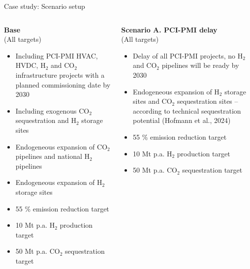 \documentclass[10pt,aspectratio=169,dvipsnames]{beamer}
\begin{document}
\begin{frame}{Case study: Scenario setup}
  \vspace{-2.1cm}
  \footnotesize
  \begin{columns}
    \begin{column}{.31\textwidth}
      \begin{minipage}[t][.45\textheight]{\linewidth}
        \begin{alertblock}{\textbf{Base}\\(All targets)}
          \scriptsize
          \begin{itemize}
            \item \alert{Including PCI-PMI} HVAC, HVDC, H$_2$ and CO$_2$ infrastructure projects with a planned commissioning date by 2030
            \item Including exogenous CO$_2$ sequestration and H$_2$ storage sites
            \item Endogeneous expansion of CO$_2$ pipelines and national H$_2$ pipelines 
            \item Endogeneous expansion of H$_2$ storage sites
            \item 55 \% emission reduction target
            \item 10 Mt p.a. H$_2$ production target
            \item 50 Mt p.a. CO$_2$ sequestration target
          \end{itemize}
        \end{alertblock}
      \end{minipage}
    \end{column}

    \begin{column}{.31\textwidth}
        \begin{minipage}[t][.45\textheight]{\linewidth}
          \begin{exampleblock}{\textbf{Scenario A. PCI-PMI delay}\\(All targets)}
            \scriptsize
            \begin{itemize}
              \item \alert{Delay of all PCI-PMI projects}, no H$_2$ and CO$_2$ pipelines will be ready by 2030
              \item \alert{Endogeneous expansion of H$_2$ storage sites and CO$_2$ sequestration sites} -- according to technical sequestration potential (Hofmann et al., 2024)
              \item 55 \% emission reduction target
              \item 10 Mt p.a. H$_2$ production target
              \item 50 Mt p.a. CO$_2$ sequestration target
            \end{itemize}
          \end{exampleblock}
        \end{minipage}
    \end{column}


\end{columns}
\end{frame}
\end{document}
